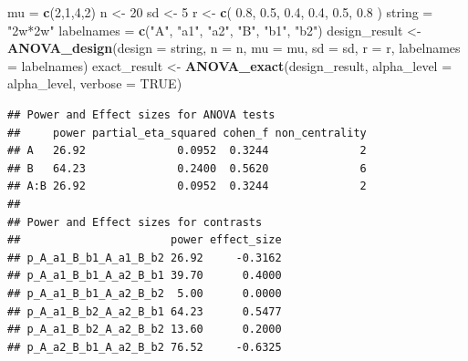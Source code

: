 \documentclass[]{book}
\newenvironment{Shaded}{\begin{snugshade}}{\end{snugshade}}
\newcommand{\DataTypeTok}[1]{\textcolor[rgb]{0.13,0.29,0.53}{#1}}
\newcommand{\DecValTok}[1]{\textcolor[rgb]{0.00,0.00,0.81}{#1}}
\newcommand{\FloatTok}[1]{\textcolor[rgb]{0.00,0.00,0.81}{#1}}
\newcommand{\KeywordTok}[1]{\textcolor[rgb]{0.13,0.29,0.53}{\textbf{#1}}}
\newcommand{\NormalTok}[1]{#1}
\newcommand{\OperatorTok}[1]{\textcolor[rgb]{0.81,0.36,0.00}{\textbf{#1}}}
\newcommand{\OtherTok}[1]{\textcolor[rgb]{0.56,0.35,0.01}{#1}}
\newcommand{\StringTok}[1]{\textcolor[rgb]{0.31,0.60,0.02}{#1}}
\begin{document}
\begin{Shaded}
\begin{Highlighting}[]
\NormalTok{mu =}\StringTok{ }\KeywordTok{c}\NormalTok{(}\DecValTok{2}\NormalTok{,}\DecValTok{1}\NormalTok{,}\DecValTok{4}\NormalTok{,}\DecValTok{2}\NormalTok{)}
\NormalTok{n <-}\StringTok{ }\DecValTok{20}
\NormalTok{sd <-}\StringTok{ }\DecValTok{5}
\NormalTok{r <-}\StringTok{ }\KeywordTok{c}\NormalTok{(}
  \FloatTok{0.8}\NormalTok{, }\FloatTok{0.5}\NormalTok{, }\FloatTok{0.4}\NormalTok{,}
  \FloatTok{0.4}\NormalTok{, }\FloatTok{0.5}\NormalTok{,}
  \FloatTok{0.8}
\NormalTok{)}
\NormalTok{string =}\StringTok{ "2w*2w"}
\NormalTok{labelnames =}\StringTok{ }\KeywordTok{c}\NormalTok{(}\StringTok{"A"}\NormalTok{, }\StringTok{"a1"}\NormalTok{, }\StringTok{"a2"}\NormalTok{, }\StringTok{"B"}\NormalTok{, }\StringTok{"b1"}\NormalTok{, }\StringTok{"b2"}\NormalTok{)}
\NormalTok{design_result <-}\StringTok{ }\KeywordTok{ANOVA_design}\NormalTok{(}\DataTypeTok{design =}\NormalTok{ string,}
                              \DataTypeTok{n =}\NormalTok{ n,}
                              \DataTypeTok{mu =}\NormalTok{ mu,}
                              \DataTypeTok{sd =}\NormalTok{ sd,}
                              \DataTypeTok{r =}\NormalTok{ r,}
                              \DataTypeTok{labelnames =}\NormalTok{ labelnames)}
\NormalTok{exact_result <-}\StringTok{ }\KeywordTok{ANOVA_exact}\NormalTok{(design_result,}
                            \DataTypeTok{alpha_level =}\NormalTok{ alpha_level,}
                            \DataTypeTok{verbose =} \OtherTok{TRUE}\NormalTok{)}
\end{Highlighting}
\end{Shaded}

\begin{verbatim}
## Power and Effect sizes for ANOVA tests
##     power partial_eta_squared cohen_f non_centrality
## A   26.92              0.0952  0.3244              2
## B   64.23              0.2400  0.5620              6
## A:B 26.92              0.0952  0.3244              2
## 
## Power and Effect sizes for contrasts
##                       power effect_size
## p_A_a1_B_b1_A_a1_B_b2 26.92     -0.3162
## p_A_a1_B_b1_A_a2_B_b1 39.70      0.4000
## p_A_a1_B_b1_A_a2_B_b2  5.00      0.0000
## p_A_a1_B_b2_A_a2_B_b1 64.23      0.5477
## p_A_a1_B_b2_A_a2_B_b2 13.60      0.2000
## p_A_a2_B_b1_A_a2_B_b2 76.52     -0.6325
\end{verbatim}

\begin{Shaded}
\end{Shaded}
\end{document}
